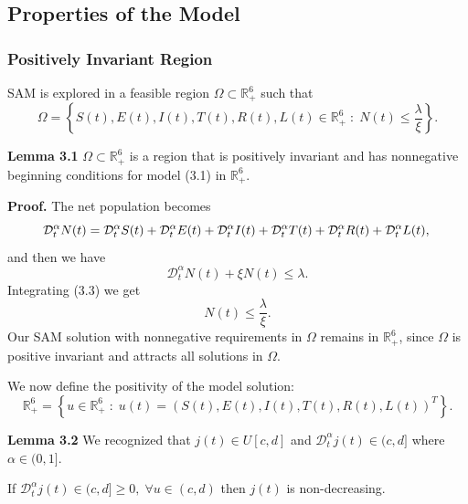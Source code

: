 \documentclass[10pt]{NSP1}
\newcommand{\CD}{\mathcal{D}}
\begin{document}
	\subsection{\bfseries Properties of the Model}
	
	\subsubsection{Positively Invariant Region}
	
	SAM is explored in a feasible region $\Omega \subset \mathbb{R}_{+}^{6}$ such that
	\begin{equation}
		\Omega = \left\{ S(t),E(t),I(t),T(t),R(t),L(t) \in \mathbb{R}_{+}^{6} \;:\; N(t) \leq \frac{\lambda}{\xi} \right\}.
		\tag{3.2}
	\end{equation}
	
	\textbf{Lemma 3.1} $\Omega \subset \mathbb{R}_{+}^{6}$ is a region that is positively invariant and has nonnegative beginning conditions for model (3.1) in $\mathbb{R}_{+}^{6}$.
	
	\textbf{Proof.} The net population becomes
	\begin{equation}
		\CD_t^\alpha N(t) =   \CD_t^\alpha S(t) +   \CD_t^\alpha E(t) +   \CD_t^\alpha I(t) +   \CD_t^\alpha T(t) +   \CD_t^\alpha R(t) +   \CD_t^\alpha L(t),
		\notag \\\end{equation}
	and then we have
	\begin{equation}
		\CD_t^\alpha N(t) + \xi N(t) \leq \lambda.
		\tag{3.3}
	\end{equation}
	Integrating (3.3) we get
	\begin{equation}
		N(t) \leq \frac{\lambda}{\xi}.
		\tag{3.4}
	\end{equation}
	Our SAM solution with nonnegative requirements in $\Omega$ remains in $\mathbb{R}_{+}^{6}$, since $\Omega$ is positive invariant and attracts all solutions in $\Omega$.
	
	We now define the positivity of the model solution:
	\begin{equation}
		\mathbb{R}_{+}^{6} = \left\{ u \in \mathbb{R}_{+}^{6} \;:\; u(t) = (S(t),E(t),I(t),T(t),R(t),L(t))^{T} \right\}.
		\tag{3.5}
	\end{equation}
	
	\textbf{Lemma 3.2} We recognized that $j(t) \in U[c,d]$ and $  \CD_t^\alpha j(t) \in (c,d]$ where $\alpha \in (0,1]$. 
	
	If $  \CD_t^\alpha j(t) \in (c,d] \ge 0,\; \forall u \in (c,d)$ then $j(t)$ is non-decreasing. 
	
\end{document}
